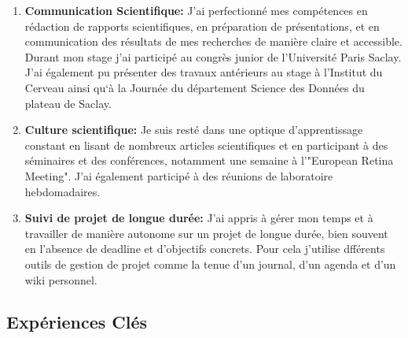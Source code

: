 \begin{enumerate}
      \item \textbf{Communication Scientifique:} J'ai perfectionné mes
            compétences en rédaction de rapports scientifiques, en préparation
            de
            présentations, et en communication des résultats de mes recherches
            de
            manière claire et accessible. Durant mon stage j'ai participé au
            congrès junior
            de l'Université Paris Saclay. J'ai également pu présenter des
            travaux
            antérieurs au stage
            à l'Institut du Cerveau ainsi qu`à la Journée du département Science
            des Données du plateau de Saclay.

      \item \textbf{Culture scientifique:} Je suis resté dans une optique
            d'apprentissage constant en lisant
            de nombreux articles scientifiques et en participant à des
            séminaires
            et des
            conférences, notamment une semaine à l'"European Retina Meeting".
            J'ai également participé à des réunions de laboratoire
            hebdomadaires.

      \item \textbf{Suivi de projet de longue durée:} J'ai appris à gérer mon
            temps et à travailler de manière autonome sur un projet de longue
            durée, bien souvent en l'absence de deadline et d'objectifs
            concrets.
            Pour cela j'utilise dfférents outils de gestion de projet comme la
            tenue d'un journal, d'un agenda et d'un wiki personnel.

\end{enumerate}

\subsection{Expériences Clés}

